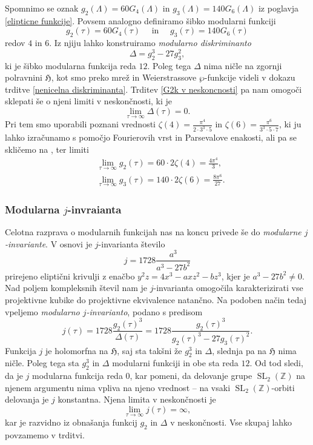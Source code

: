 \documentclass[mat1]{fmfdelo}
\numberwithin{equation}{section}
\newcommand{\Z}{\mathbb Z}
\newcommand{\HH}{\mathfrak{H}}
\newcommand{\SL}{\operatorname{SL}_2(\Z)}
\theoremstyle{definition}
\begin{document}
Spomnimo se oznak $g_2(\Lambda) = 60G_4(\Lambda)$ in $g_3(\Lambda) = 140G_6(\Lambda)$ iz poglavja \ref{elipticne funkcije}. Povsem analogno definiramo šibko modularni funkciji
\[
    g_2(\tau) = 60G_4(\tau) \quad \text{ in } \quad g_3(\tau) = 140G_6(\tau)
\]
redov $4$ in $6$. Iz njiju lahko konstruiramo \emph{modularno diskriminanto}
\[
    \Delta = g_2^3 - 27g_3^2,
\]
ki je šibko modularna funkcija reda $12$. Poleg tega $\Delta$ nima ničle na zgornji polravnini $\HH$, kot smo preko mrež in Weierstrassove $\wp$-funkcije videli v dokazu trditve \ref{nenicelna diskriminanta}. Trditev \ref{G2k v neskoncnosti} pa nam omogoči sklepati še o njeni limiti v neskončnosti, ki je 
\[
    \lim_{\tau \to \infty} \Delta(\tau) = 0.
\]
Pri tem smo uporabili poznani vrednosti $\zeta(4) = \frac{\pi^4}{2\cdot3^3\cdot5}$ in $\zeta(6) = \frac{\pi^6}{3^3\cdot5\cdot7}$, ki ju lahko izračunamo s pomočjo Fourierovih vrst in Parsevalove enakosti, ali pa se skličemo na \cite[VII, \S4.1]{Serre}, ter limiti
\begin{align*}
    &\lim_{\tau \to \infty} g_2(\tau) = 60\cdot2 \zeta(4) = \frac{4\pi^4}{3},\\
    &\lim_{\tau \to \infty} g_3(\tau) = 140\cdot2 \zeta(6) = \frac{8\pi^6}{27}.
\end{align*}

\subsubsection*{Modularna $j$-invraianta} Celotna razprava o modularnih funkcijah nas na koncu privede še do \emph{modularne $j$-invariante}. V osnovi je $j$-invarianta število 
\[
    j = 1728\frac{a^3}{a^3 - 27b^2}
\]
prirejeno eliptični krivulji z enačbo $y^2z = 4x^3 - axz^2 - bz^3$, kjer je $a^3 - 27b^2 \neq 0$. Nad poljem kompleksnih števil nam je $j$-invarianta omogočila karakterizirati vse projektivne kubike do projektivne ekvivalence natančno. Na podoben način tedaj vpeljemo \emph{modularno $j$-invarianto}, podano s predisom
\[
    j(\tau) = 1728\frac{g_2(\tau)^3}{\Delta(\tau)}
    = 1728\frac{g_2(\tau)^3}{g_2(\tau)^3 - 27g_3(\tau)^2}.
\]
Funkcija $j$ je holomorfna na $\HH$, saj sta takšni že $g_2^3$ in $\Delta$, slednja pa na $\HH$ nima ničle. Poleg tega sta $g_2^3$ in $\Delta$ modularni funkciji in obe sta reda $12$. Od tod sledi, da je $j$ modularna funkcija reda $0$, kar pomeni, da delovanje grupe $\SL$ na njenem argumentu nima vpliva na njeno vrednost -- na vsaki $\SL$-orbiti delovanja je $j$ konstantna. Njena limita v neskončnosti je 
\[
    \lim_{\tau \to \infty}j(\tau) = \infty,
\]
kar je razvidno iz obnašanja funkcij $g_2$ in $\Delta$ v neskončnosti. Vse skupaj lahko povzamemo v trditvi.
\end{document}
